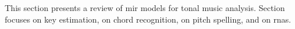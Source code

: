 

This section presents a review of \gls{mir} models for tonal music analysis. Section  focuses on key estimation,  on chord recognition,  on pitch spelling, and  on \glspl{rna}.
